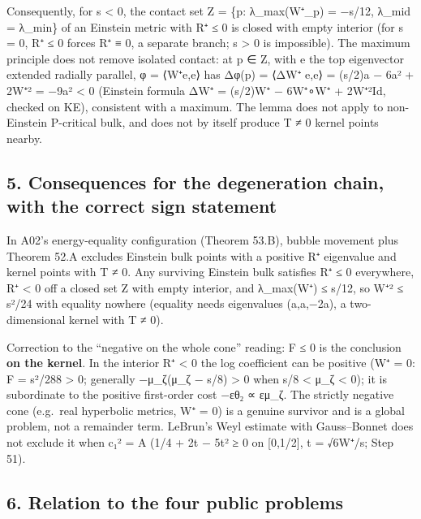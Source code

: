 \documentclass[
  10pt,
]{report}
\begin{document}
Consequently, for s \textless{} 0, the contact set Z = \{p:
λ\_max(W⁺\_p) = −s/12, λ\_mid = λ\_min\} of an Einstein metric with R⁺ ≤
0 is closed with empty interior (for s = 0, R⁺ ≤ 0 forces R⁺ ≡ 0, a
separate branch; s \textgreater{} 0 is impossible). The maximum
principle does not remove isolated contact: at p ∈ Z, with e the top
eigenvector extended radially parallel, φ = ⟨W⁺e,e⟩ has Δφ(p) = ⟨ΔW⁺
e,e⟩ = (s/2)a − 6a² + 2\textbar W⁺\textbar² = −9a² \textless{} 0
(Einstein formula ΔW⁺ = (s/2)W⁺ − 6W⁺∘W⁺ + 2\textbar W⁺\textbar²Id,
checked on KE), consistent with a maximum. The lemma does not apply to
non-Einstein P-critical bulk, and does not by itself produce T ≠ 0
kernel points nearby.

\hypertarget{consequences-for-the-degeneration-chain-with-the-correct-sign-statement}{%
\subsection{5. Consequences for the degeneration chain, with the correct
sign
statement}\label{consequences-for-the-degeneration-chain-with-the-correct-sign-statement}}

In A02's energy-equality configuration (Theorem 53.B), bubble movement
plus Theorem 52.A excludes Einstein bulk points with a positive R⁺
eigenvalue and kernel points with T ≠ 0. Any surviving Einstein bulk
satisfies R⁺ ≤ 0 everywhere, R⁺ \textless{} 0 off a closed set Z with
empty interior, and λ\_max(W⁺) ≤ \textbar s\textbar/12, so
\textbar W⁺\textbar² ≤ s²/24 with equality nowhere (equality needs
eigenvalues (a,a,−2a), a two-dimensional kernel with T ≠ 0).

Correction to the ``negative on the whole cone'' reading: F ≤ 0 is the
conclusion \textbf{on the kernel}. In the interior R⁺ \textless{} 0 the
log coefficient can be positive (W⁺ = 0: F = s²/288 \textgreater{} 0;
generally −μ\_ζ(μ\_ζ − s/8) \textgreater{} 0 when s/8 \textless{} μ\_ζ
\textless{} 0); it is subordinate to the positive first-order cost −εθ₂
∝ ε\textbar μ\_ζ\textbar. The strictly negative cone (e.g.~real
hyperbolic metrics, W⁺ = 0) is a genuine survivor and is a global
problem, not a remainder term. LeBrun's Weyl estimate with Gauss--Bonnet
does not exclude it when c₁² = A (1/4 + 2t − 5t² ≥ 0 on {[}0,1/2{]}, t =
√6\textbar W⁺\textbar/\textbar s\textbar; Step 51).

\hypertarget{relation-to-the-four-public-problems}{%
\subsection{6. Relation to the four public
problems}\label{relation-to-the-four-public-problems}}
\end{document}
